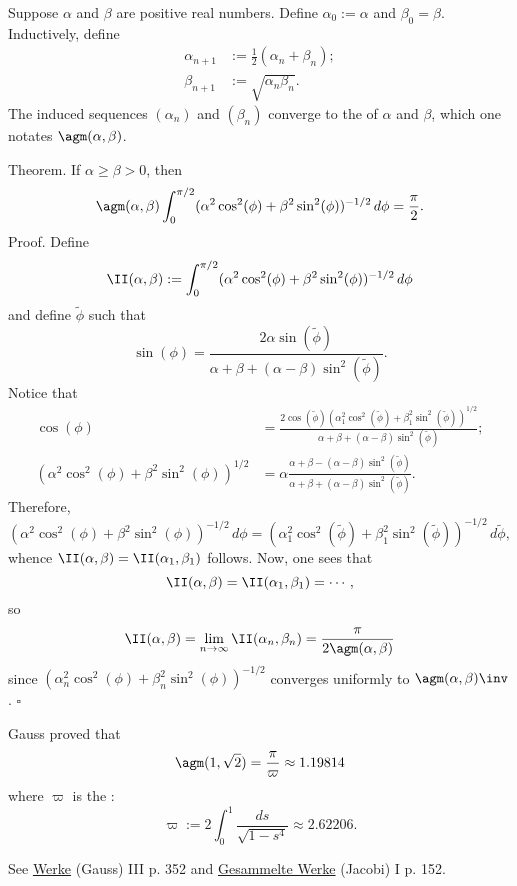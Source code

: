\documentclass[preview, border=16pt]{standalone}
\begin{document}
\pagecolor{black}
\color{white}
Suppose $\alpha$ and $\beta$ are positive real numbers. Define $\alpha_0 := \alpha$ and $\beta_0=\beta$. Inductively, define
\begin{align*}
\alpha_{n+1} &:= \frac{1}{2}(\alpha_n + \beta_n);\\
\beta_{n+1} &:= \sqrt{\alpha_n\beta_n}.
\end{align*}
The induced sequences $(\alpha_n)$ and $(\beta_n)$ converge to the  of $\alpha$ and $\beta$, which one notates $\agm (\alpha,\beta)$.

Theorem.\quad
If $\alpha\ge\beta>0$, then
\[
\agm (\alpha,\beta) \int_0^{\pi/2} (\alpha^2\cos^2(\phi) + \beta^2\sin^2(\phi))^{-1/2}\,d\phi = \frac{\pi}{2}.
\]
Proof.\quad
Define
\[
\II(\alpha,\beta) := \int_0^{\pi/2} (\alpha^2\cos^2(\phi) + \beta^2\sin^2(\phi))^{-1/2}\,d\phi
\]
and define $\tilde\phi$ such that
\[
\sin (\phi) = \frac{2\alpha\sin( \tilde \phi)}{\alpha+\beta+(\alpha-\beta)\sin^2(\tilde\phi)}.
\]
Notice that
\begin{align*}
\cos (\phi) &= \frac{2\cos(\tilde \phi)(\alpha_1^2 \cos^2(\tilde\phi) + \beta_1^2 \sin^2(\tilde \phi))^{1/2}}{\alpha+\beta+(\alpha-\beta)\sin^2(\tilde \phi)};\\
(\alpha^2\cos^2(\phi) + \beta^2\sin^2(\phi))^{1/2} &= \alpha\frac{\alpha+\beta-(\alpha-\beta)\sin^2(\tilde\phi)}{\alpha+\beta+(\alpha-\beta)\sin^2(\tilde\phi)}.
\end{align*}
Therefore,
\[
(\alpha^2\cos^2(\phi) + \beta^2\sin^2(\phi))^{-1/2}\,d\phi = (\alpha_1^2\cos^2(\tilde\phi) + \beta_1^2 \sin^2(\tilde\phi))^{-1/2}\, d\tilde \phi,
\]
whence $\II(\alpha,\beta) = \II(\alpha_1,\beta_1)$ follows.
Now, one sees that
\[
\II(\alpha,\beta) = \II(\alpha_1,\beta_1) = \cdots,
\]
so
\[
\II(\alpha,\beta) = \lim_{n\to\infty} \II(\alpha_n,\beta_n) = \frac{\pi}{2\agm (\alpha,\beta)}
\]
since $(\alpha_n^2\cos^2(\phi) + \beta_n^2\sin^2(\phi))^{-1/2}$ converges uniformly to $\agm (\alpha,\beta)\inv$.\hfill 
$\square$

Gauss proved that 
\[
\agm (1,\sqrt{2}) = \frac{\pi}{\varpi} \approx 1.19814
\]
where $\varpi$ is the :
\[
\varpi := 2\int_{0}^1\frac{ds}{\sqrt{1-s^4}}\approx 2.62206.
\]

\footnotesize
See \underline{Werke} (Gauss) III p. 352 and \underline{Gesammelte Werke} (Jacobi) I p. 152.
\end{document}
